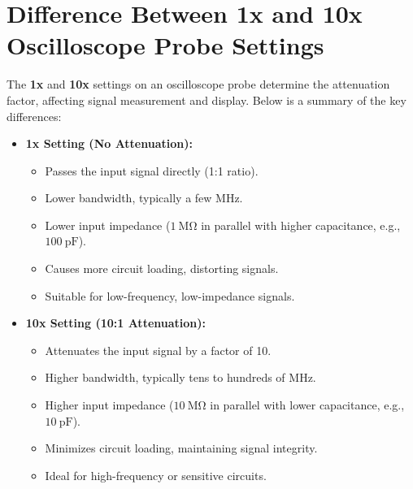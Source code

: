 \documentclass[12pt]{article}
\begin{document}
\section{Difference Between 1x and 10x Oscilloscope Probe Settings}

The \textbf{1x} and \textbf{10x} settings on an oscilloscope probe determine the attenuation factor, affecting signal measurement and display. Below is a summary of the key differences:

\begin{itemize}
    \item \textbf{1x Setting (No Attenuation):}
    \begin{itemize}
        \item Passes the input signal directly (1:1 ratio).
        \item Lower bandwidth, typically a few MHz.
        \item Lower input impedance (\(1~\mathrm{M\Omega}\) in parallel with higher capacitance, e.g., \(100~\mathrm{pF}\)).
        \item Causes more circuit loading, distorting signals.
        \item Suitable for low-frequency, low-impedance signals.
    \end{itemize}

    \item \textbf{10x Setting (10:1 Attenuation):}
    \begin{itemize}
        \item Attenuates the input signal by a factor of 10.
        \item Higher bandwidth, typically tens to hundreds of MHz.
        \item Higher input impedance (\(10~\mathrm{M\Omega}\) in parallel with lower capacitance, e.g., \(10~\mathrm{pF}\)).
        \item Minimizes circuit loading, maintaining signal integrity.
        \item Ideal for high-frequency or sensitive circuits.
    \end{itemize}
\end{itemize}
\end{document}

